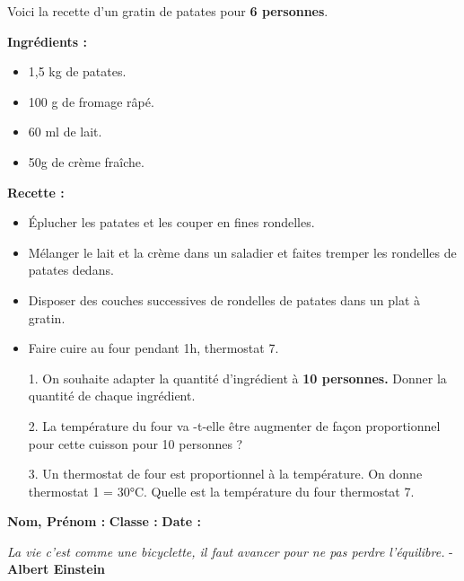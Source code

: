 Voici la recette d'un gratin de patates pour \textbf{6 personnes}. 

\begin{minipage}[t]{0.45\textwidth}
  \textbf{Ingrédients : }
  \begin{itemize}
    \item 1,5 kg de patates.
    \item 100 g de fromage râpé.
    \item 60 ml de lait.
    \item 50g de crème fraîche.
  \end{itemize}

\end{minipage}
\begin{minipage}[t]{0.5\textwidth}
  \textbf{Recette :}
  \begin{itemize}
    \item Éplucher les patates et les couper en fines rondelles.
    \item Mélanger le lait et la crème dans un saladier et faites tremper les rondelles de patates dedans.
    \item Disposer des couches successives de rondelles de patates dans un plat à gratin. 
    \item Faire cuire au four pendant 1h, thermostat 7.
  \end{itemize}
\end{minipage}

\begin{enumerate}
  \item[1.] On souhaite adapter la quantité d'ingrédient à \textbf{10 personnes.} Donner la quantité de chaque ingrédient. \\ \Pointilles[7] 
  \item[2.] La température du four va -t-elle être augmenter de façon proportionnel pour cette cuisson pour 10 personnes ?  \\ \Pointilles[2] 
  \item[3.] Un thermostat de four est proportionnel à la température. On donne thermostat 1 = 30°C. Quelle est la température du four thermostat 7. \\ \Pointilles[3] 
\end{enumerate}

\newpage


\textbf{Nom, Prénom :} \hspace{8cm} \textbf{Classe :} \hspace{3cm} \textbf{Date :}\\
\vspace{-0.8cm}
\begin{center}
  \textit{La vie c’est comme une bicyclette, il faut avancer pour ne pas perdre l’équilibre.} - \textbf{Albert Einstein}
\end{center}
\vspace{-0.8cm}

